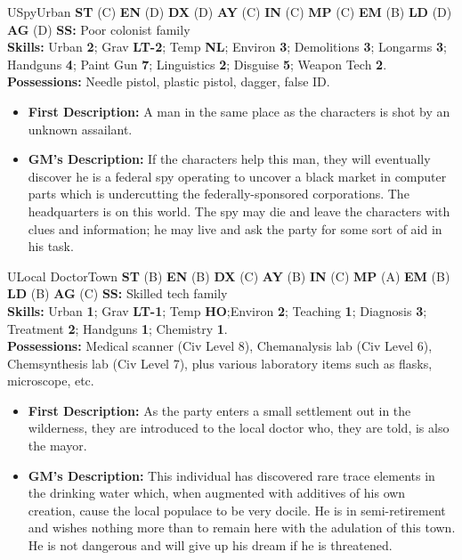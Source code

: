 \hrulefill

\begin{npc}{U}{Spy}{Urban}
\textbf{ST} (C) \textbf{EN} (D) \textbf{DX} (D) \textbf{AY} (C) \textbf{IN} (C) \textbf{MP} (C) \textbf{EM} (B) \textbf{LD} (D) \textbf{AG} (D) \textbf{SS:} Poor colonist family \\
\textbf{Skills:} Urban \textbf{2}; Grav \textbf{LT-2}; Temp \textbf{NL}; Environ \textbf{3}; Demolitions \textbf{3}; Longarms \textbf{3}; Handguns \textbf{4}; Paint Gun \textbf{7}; Linguistics \textbf{2}; Disguise \textbf{5}; 
Weapon Tech \textbf{2}. \\
\textbf{Possessions:} Needle pistol, plastic pistol, dagger, false ID. 
\begin{itemize}
\item \textbf{First Description:} A man in the same place as the characters is shot by an unknown assailant. 
\item \textbf{GM's Description:} If the characters help this man, they will eventually discover he is a federal spy operating to uncover a black 
market in computer parts which is undercutting the federally-sponsored corporations. The headquarters is on this world. The spy may 
die and leave the characters with clues and information; he may live and ask the party for some sort of aid in his task. 
\end{itemize}
\end{npc}

\hrulefill

\begin{npc}{U}{Local Doctor}{Town}
\textbf{ST} (B) \textbf{EN} (B) \textbf{DX} (C) \textbf{AY} (B) \textbf{IN} (C) \textbf{MP} (A) \textbf{EM} (B) \textbf{LD} (B) \textbf{AG} (C) \textbf{SS:} Skilled tech family \\
\textbf{Skills:} Urban \textbf{1}; Grav \textbf{LT-1}; Temp \textbf{HO};Environ \textbf{2}; Teaching \textbf{1}; Diagnosis \textbf{3}; Treatment \textbf{2}; Handguns \textbf{1}; Chemistry \textbf{1}. \\
\textbf{Possessions:} Medical scanner (Civ Level 8), Chemanalysis lab (Civ Level 6), Chemsynthesis lab (Civ Level 7), plus various laboratory 
items such as flasks, microscope, etc. 
\begin{itemize}
\item \textbf{First Description:} As the party enters a small settlement out in the wilderness, they are introduced to the local doctor who, they are 
told, is also the mayor. 
\item \textbf{GM's Description:} This individual has discovered rare trace elements in the drinking water which, when augmented with additives of 
his own creation, cause the local populace to be very docile. He is in semi-retirement and wishes nothing more than to remain here 
with the adulation of this town. He is not dangerous and will give up his dream if he is threatened. 
\end{itemize}
\end{npc}


